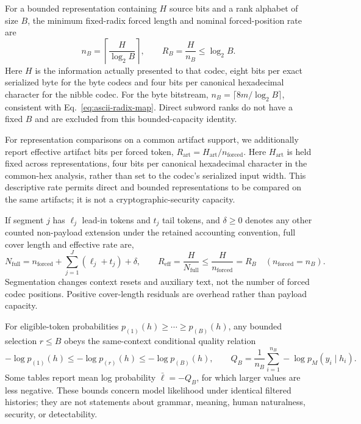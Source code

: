 \documentclass[fleqn,10pt]{wlscirep}
\begin{document}
For a bounded representation containing \(H\) source bits and a rank alphabet of size \(B\), the minimum fixed-radix forced length and nominal forced-position rate are
\begin{equation}
n_B=\left\lceil\frac{H}{\log_2B}\right\rceil,
\qquad
R_B=\frac{H}{n_B}\le\log_2B.
\label{eq:capacity}
\end{equation}
Here \(H\) is the information actually presented to that codec, eight bits per exact serialized byte for the byte codecs and four bits per canonical hexadecimal character for the nibble codec. For the byte bitstream, \(n_B=\lceil8m/\log_2B\rceil\), consistent with Eq.~\eqref{eq:ascii-radix-map}. Direct subword ranks do not have a fixed \(B\) and are excluded from this bounded-capacity identity.

For representation comparisons on a common artifact support, we additionally report effective artifact bits per forced token, \(R_{\mathrm{art}}=H_{\mathrm{art}}/n_{\mathrm{forced}}\). Here \(H_{\mathrm{art}}\) is held fixed across representations, four bits per canonical hexadecimal character in the common-hex analysis, rather than set to the codec's serialized input width. This descriptive rate permits direct and bounded representations to be compared on the same artifacts; it is not a cryptographic-security capacity.

If segment \(j\) has \(\ell_j\) lead-in tokens and \(t_j\) tail tokens, and \(\delta\ge0\) denotes any other counted non-payload extension under the retained accounting convention, full cover length and effective rate are,
\begin{equation}
N_{\mathrm{full}}
=n_{\mathrm{forced}}+\sum_{j=1}^{J}(\ell_j+t_j)+\delta,
\qquad
R_{\mathrm{eff}}=\frac{H}{N_{\mathrm{full}}}
\le\frac{H}{n_{\mathrm{forced}}}=R_B
\quad(n_{\mathrm{forced}}=n_B).
\label{eq:effective-rate}
\end{equation}
Segmentation changes context resets and auxiliary text, not the number of forced codec positions. Positive cover-length residuals are overhead rather than payload capacity.

For eligible-token probabilities \(p_{(1)}(h)\ge\cdots\ge p_{(B)}(h)\), any bounded selection \(r\le B\) obeys the same-context conditional quality relation
\begin{equation}
-\log p_{(1)}(h)
\le-\log p_{(r)}(h)
\le-\log p_{(B)}(h),\qquad
Q_B=\frac{1}{n_B}\sum_{i=1}^{n_B}-\log p_M(y_i\mid h_i).
\label{eq:quality-bound}
\end{equation}
Some tables report mean log probability \(\bar\ell=-Q_B\), for which larger values are less negative. These bounds concern model likelihood under identical filtered histories; they are not statements about grammar, meaning, human naturalness, security, or detectability.
\end{document}
